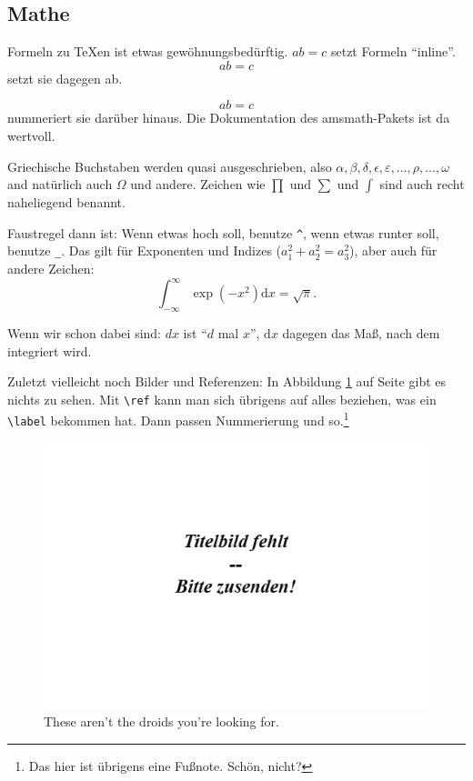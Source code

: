 \documentclass{doku2018}
\begin{document}
\subsection{Mathe}

Formeln zu \TeX en ist etwas gewöhnungsbedürftig. $ab=c$ setzt Formeln
"`inline"'. \[ab=c\] setzt sie dagegen ab.

\begin{equation}
  ab=c
\end{equation} nummeriert sie darüber hinaus. Die Dokumentation des amsmath-Pakets ist da
wertvoll.

Griechische Buchstaben werden quasi ausgeschrieben, also $\alpha, \beta, \delta,
\epsilon, \varepsilon, \dots, \rho, \dots,\omega$ and natürlich auch $\Omega$
und andere. Zeichen wie $\prod$ und $\sum$ und $\int$ sind auch recht
naheliegend benannt.

Faustregel dann ist: Wenn etwas hoch soll, benutze \verb|^|, wenn etwas runter
soll, benutze \verb|_|. Das gilt für Exponenten und Indizes
($a_1^2+a_2^2=a_3^2$), aber auch für andere Zeichen: \[ \int_{-\infty}^{\infty}
  \exp(-x^2)\mathrm{d}x = \sqrt{\pi}.\]

Wenn wir schon dabei sind: $dx$ ist "`$d$ mal $x$"', $\mathrm{d}x$ dagegen das
Maß, nach dem integriert wird.

Zuletzt vielleicht noch Bilder und Referenzen: In Abbildung
\ref{fig:starwarsreferenz} auf Seite \pageref{fig:starwarsreferenz} gibt es
nichts zu sehen. Mit \verb|\ref| kann man sich übrigens auf alles beziehen, was
ein \verb|\label| bekommen hat. Dann passen Nummerierung und so.\footnote{Das
  hier ist übrigens eine Fußnote. Schön, nicht?}

\begin{figure}
\begin{center}
\includegraphics[width=.9\columnwidth]{Titelbild-fehlt.png}
\caption{These aren't the droids you're looking for.}
\label{fig:starwarsreferenz}
\end{center}
\end{figure}
\end{document}
